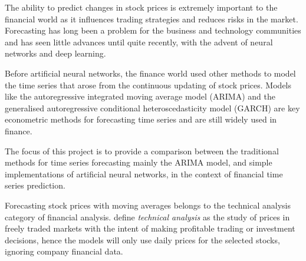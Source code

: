 The ability to predict changes in stock prices is extremely important to the financial world as it influences trading strategies and reduces risks in the market. Forecasting has long been a problem for the business and technology communities and has seen little advances until quite recently, with the advent of neural networks and deep learning.

Before artificial neural networks, the finance world used other methods to model the time series that arose from the continuous updating of stock prices. Models like the autoregressive integrated moving average model (ARIMA) and the generalised autoregressive conditional heteroscedasticity model (GARCH) are key econometric methods for forecasting time series and are still widely used in finance.

The focus of this project is to provide a comparison between the traditional methods for time series forecasting mainly the ARIMA model, and simple implementations of artificial neural networks, in the context of financial time series prediction.

Forecasting stock prices with moving averages belongs to the technical analysis category of financial analysis. \citeauthor{tech_analysis} define \textit{technical analysis} as the study of prices in freely traded markets with the intent of making profitable trading or investment decisions\cite{tech_analysis}, hence the models will only use daily prices for the selected stocks, ignoring company financial data.



